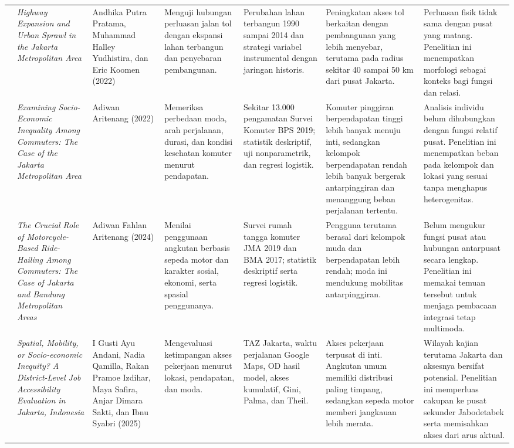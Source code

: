\documentclass[11pt,a4paper,oneside,openany,indonesian]{report}
\begin{document}
\begin{landscape}
\begin{longtable}{>{\centering\arraybackslash}p{0.55cm}p{3.4cm}p{3.0cm}p{3.6cm}p{3.9cm}p{4.0cm}p{4.5cm}}
7 & \textit{Highway Expansion and Urban Sprawl in the Jakarta Metropolitan Area} & Andhika Putra Pratama, Muhammad Halley Yudhistira, dan Eric Koomen (2022) & Menguji hubungan perluasan jalan tol dengan ekspansi lahan terbangun dan penyebaran pembangunan. & Perubahan lahan terbangun 1990 sampai 2014 dan strategi variabel instrumental dengan jaringan historis. & Peningkatan akses tol berkaitan dengan pembangunan yang lebih menyebar, terutama pada radius sekitar 40 sampai 50 km dari pusat Jakarta. & Perluasan fisik tidak sama dengan pusat yang matang. Penelitian ini menempatkan morfologi sebagai konteks bagi fungsi dan relasi.\\
8 & \textit{Examining Socio-Economic Inequality Among Commuters: The Case of the Jakarta Metropolitan Area} & Adiwan Aritenang (2022) & Memeriksa perbedaan moda, arah perjalanan, durasi, dan kondisi kesehatan komuter menurut pendapatan. & Sekitar 13.000 pengamatan Survei Komuter BPS 2019; statistik deskriptif, uji nonparametrik, dan regresi logistik. & Komuter pinggiran berpendapatan tinggi lebih banyak menuju inti, sedangkan kelompok berpendapatan rendah lebih banyak bergerak antarpinggiran dan menanggung beban perjalanan tertentu. & Analisis individu belum dihubungkan dengan fungsi relatif pusat. Penelitian ini menempatkan beban pada kelompok dan lokasi yang sesuai tanpa menghapus heterogenitas.\\
9 & \textit{The Crucial Role of Motorcycle-Based Ride-Hailing Among Commuters: The Case of Jakarta and Bandung Metropolitan Areas} & Adiwan Fahlan Aritenang (2024) & Menilai penggunaan angkutan berbasis sepeda motor dan karakter sosial, ekonomi, serta spasial penggunanya. & Survei rumah tangga komuter JMA 2019 dan BMA 2017; statistik deskriptif serta regresi logistik. & Pengguna terutama berasal dari kelompok muda dan berpendapatan lebih rendah; moda ini mendukung mobilitas antarpinggiran. & Belum mengukur fungsi pusat atau hubungan antarpusat secara lengkap. Penelitian ini memakai temuan tersebut untuk menjaga pembacaan integrasi tetap multimoda.\\
10 & \textit{Spatial, Mobility, or Socio-economic Inequity? A District-Level Job Accessibility Evaluation in Jakarta, Indonesia} & I Gusti Ayu Andani, Nadia Qamilla, Rakan Pramoe Izdihar, Maya Safira, Anjar Dimara Sakti, dan Ibnu Syabri (2025) & Mengevaluasi ketimpangan akses pekerjaan menurut lokasi, pendapatan, dan moda. & TAZ Jakarta, waktu perjalanan Google Maps, OD hasil model, akses kumulatif, Gini, Palma, dan Theil. & Akses pekerjaan terpusat di inti. Angkutan umum memiliki distribusi paling timpang, sedangkan sepeda motor memberi jangkauan lebih merata. & Wilayah kajian terutama Jakarta dan aksesnya bersifat potensial. Penelitian ini memperluas cakupan ke pusat sekunder Jabodetabek serta memisahkan akses dari arus aktual.\\

\end{longtable}
\end{landscape}
\end{document}
